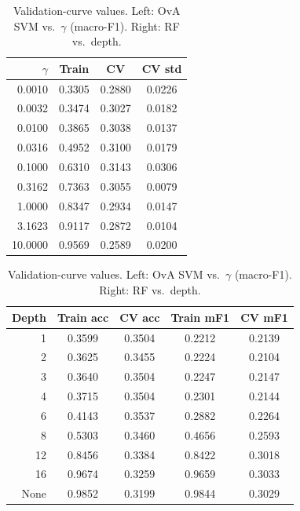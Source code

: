 \documentclass[11pt]{article}
\begin{document}
\begin{table}[H]\centering\small
\caption{Validation-curve values. Left: OvA SVM vs.\ $\gamma$ (macro-F1). Right: RF vs.\ depth.}\label{tab:vc}
\begin{tabular}{@{}rccc@{}}
\toprule
$\gamma$ & Train & CV & CV std \\
\midrule
0.0010 & 0.3305 & 0.2880 & 0.0226 \\
0.0032 & 0.3474 & 0.3027 & 0.0182 \\
0.0100 & 0.3865 & 0.3038 & 0.0137 \\
0.0316 & 0.4952 & 0.3100 & 0.0179 \\
0.1000 & 0.6310 & 0.3143 & 0.0306 \\
0.3162 & 0.7363 & 0.3055 & 0.0079 \\
1.0000 & 0.8347 & 0.2934 & 0.0147 \\
3.1623 & 0.9117 & 0.2872 & 0.0104 \\
10.0000 & 0.9569 & 0.2589 & 0.0200 \\
\bottomrule
\end{tabular}\quad
\begin{tabular}{@{}rcccc@{}}
\toprule
Depth & Train acc & CV acc & Train mF1 & CV mF1 \\
\midrule
1 & 0.3599 & 0.3504 & 0.2212 & 0.2139 \\
2 & 0.3625 & 0.3455 & 0.2224 & 0.2104 \\
3 & 0.3640 & 0.3504 & 0.2247 & 0.2147 \\
4 & 0.3715 & 0.3504 & 0.2301 & 0.2144 \\
6 & 0.4143 & 0.3537 & 0.2882 & 0.2264 \\
8 & 0.5303 & 0.3460 & 0.4656 & 0.2593 \\
12 & 0.8456 & 0.3384 & 0.8422 & 0.3018 \\
16 & 0.9674 & 0.3259 & 0.9659 & 0.3033 \\
None & 0.9852 & 0.3199 & 0.9844 & 0.3029 \\
\bottomrule
\end{tabular}
\end{table}
\end{document}
